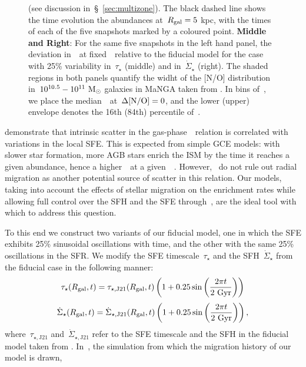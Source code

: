 \documentclass[ms.tex]{subfiles}
\begin{document}
\begin{figure}
{(see discussion in~\S~\ref{sec:multizone}).
The black dashed line shows the time evolution the abundances at~$R_\text{gal} = 5$
kpc, with the times of each of the five snapshots marked by a coloured point.
\textbf{Middle and Right}: For the same five snapshots in the left hand panel,
the deviation in~\no~at fixed~\oh~relative to the fiducial model for the case
with 25\% variability in~$\tau_\star$ (middle) and in~$\dot{\Sigma}_\star$
(right).
The shaded regions in both panels quantify the widht of the [N/O] distribution
in~$10^{10.5} - 10^{11}~\text{M}_\odot$ galaxies in MaNGA taken from
\citet{Schaefer2020}.
In bins of~\oh, we place the median~\no~at~$\Delta\text{[N/O]} = 0$, and the lower
(upper) envelope denotes the 16th (84th) percentile of~\no.
}
\label{fig:schaefer_comp}
\end{figure}

\citet{Schaefer2020} demonstrate that intrinsic scatter in the
gas-phase~\ohno~relation is correlated with variations in the local SFE.
This is expected from simple GCE models: with slower star formation, more AGB
stars enrich the ISM by the time it reaches a given abundance, hence a
higher~\no~at a given~\oh~\citep[e.g.][]{Molla2006, Vincenzo2016a}.
However,~\citet{Schaefer2020} do not rule out radial migration as another
potential source of scatter in this relation.
Our models, taking into account the effects of stellar migration on the
enrichment rates while allowing full control over the SFH and the SFE
through~\vice, are the ideal tool with which to address this question.
\par
To this end we construct two variants of our fiducial model, one in which the
SFE exhibits 25\% sinusoidal oscillations with time, and the other with the
same 25\% oscillations in the SFR.
We modify the SFE timescale~$\tau_\star$ and the SFH~$\dot{\Sigma}_\star$ from
the fiducial case in the following manner:
\begin{equation}
\tau_\star(R_\text{gal}, t) = \tau_{\star,\text{J21}}(R_\text{gal}, t)
\left(1 + 0.25\sin\left(\frac{2\pi t}{2~\text{Gyr}}\right)\right)
\label{eq:sfe_var}
\end{equation}
\begin{equation}
\dot{\Sigma}_\star(R_\text{gal}, t) = \dot{\Sigma}_{\star,\text{J21}}(R_\text{gal}, t)
\left(1 + 0.25\sin\left(\frac{2\pi t}{2~\text{Gyr}}\right)\right),
\label{eq:sfr_var}
\end{equation}
where~$\tau_{\star,\text{J21}}$ and~$\dot{\Sigma}_{\star,\text{J21}}$ refer to
the SFE timescale and the SFH in the fiducial model taken from
\citet{Johnson2021}.
In~\hsim, the simulation from which the migration history of our model is drawn,
\end{document}
